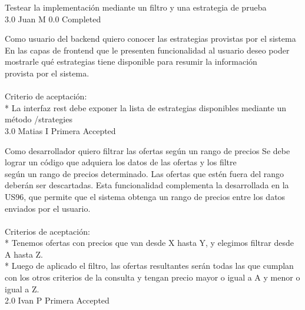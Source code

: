 		{Testear la implementación mediante un filtro y una estrategia de prueba} %
		{\\
} %
		{3.0} %
		{Juan M} %
		{0.0} %
		{Completed} %


\vspace{20pt}

	{Como usuario del backend quiero conocer las estrategias provistas por el sistema} %
	{En las capas de frontend que le presenten funcionalidad al usuario deseo poder\\
mostrarle qué estrategias tiene disponible para resumir la información\\
provista por el sistema.\\
  \\
Criterio de aceptación:\\
* La interfaz rest debe exponer la lista de estrategias disponibles mediante un método /strategies\\
} %
	{} %
	{3.0} %
	{Matias I} %
	{Primera} %
	{Accepted} %


\vspace{20pt}

	{Como desarrollador quiero filtrar las ofertas según un rango de precios} %
	{Se debe lograr un código que adquiera los datos de las ofertas y los filtre\\
según un rango de precios determinado. Las ofertas que estén fuera del rango\\
deberán ser descartadas. Esta funcionalidad complementa la desarrollada en la\\
US96, que permite que el sistema obtenga un rango de precios entre los datos\\
enviados por el usuario.\\
  \\
Criterios de aceptación:\\
* Tenemos ofertas con precios que van desde X hasta Y, y elegimos filtrar desde A hasta Z.   \\
* Luego de aplicado el filtro, las ofertas resultantes serán todas las que cumplan con los otros criterios de la consulta y tengan precio mayor o igual a A y menor o igual a Z.  \\
} %
	{} %
	{2.0} %
	{Ivan P} %
	{Primera} %
	{Accepted} %

